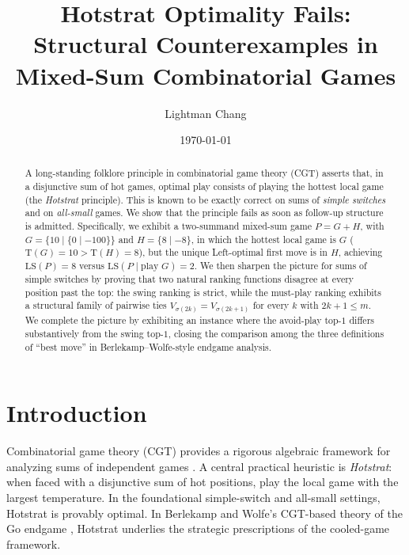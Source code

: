 \documentclass[11pt,a4paper]{amsart}
\title[Hotstrat optimality fails]{Hotstrat Optimality Fails:\\
  Structural Counterexamples in Mixed-Sum Combinatorial Games}
\author{Lightman Chang}
\date{\today}
\theoremstyle{definition}
\theoremstyle{remark}
\newcommand{\LS}{\mathrm{LS}}
\newcommand{\Tt}{\mathrm{T}}
\begin{document}
\maketitle

\begin{abstract}
A long-standing folklore principle in combinatorial game theory (CGT)
asserts that, in a disjunctive sum of hot games, optimal play consists of
playing the hottest local game (the \emph{Hotstrat} principle). This is
known to be exactly correct on sums of \emph{simple switches} and on
\emph{all-small} games. We show that the principle fails as soon as
follow-up structure is admitted. Specifically, we exhibit a two-summand
mixed-sum game $P = G + H$, with $G = \{10 \mid \{0 \mid -100\}\}$ and
$H = \{8 \mid -8\}$, in which the hottest local game is $G$
($\Tt(G) = 10 > \Tt(H) = 8$), but the unique Left-optimal first move is
in $H$, achieving $\LS(P) = 8$ versus $\LS(P \mid \text{play } G) = 2$.
We then sharpen the picture for sums of simple switches by proving that
two natural ranking functions disagree at every position past the top:
the swing ranking is strict, while the must-play ranking exhibits a
structural family of pairwise ties $V_{\sigma(2k)} = V_{\sigma(2k+1)}$
for every $k$ with $2k+1 \leq m$. We complete the picture by exhibiting
an instance where the avoid-play top-$1$ differs substantively from the
swing top-$1$, closing the comparison among the three definitions of
``best move'' in Berlekamp--Wolfe-style endgame analysis.
\end{abstract}

\section{Introduction}\label{sec:intro}

Combinatorial game theory (CGT) provides a rigorous algebraic framework
for analyzing sums of independent games \cite{Conway1976,BCG1982}.
A central practical heuristic is \emph{Hotstrat}: when faced with a
disjunctive sum of hot positions, play the local game with the largest
temperature. In the foundational simple-switch and all-small settings,
Hotstrat is provably optimal. In Berlekamp and Wolfe's CGT-based theory
of the Go endgame \cite{BW1994}, Hotstrat underlies the strategic
prescriptions of the cooled-game framework.
\end{document}
